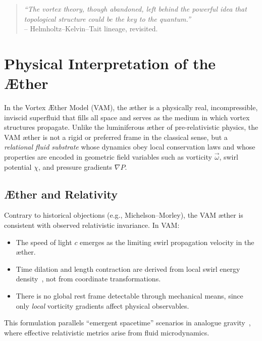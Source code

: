     \begin{quote}

    \textit{“The vortex theory, though abandoned, left behind the powerful idea that topological structure could be the key to the quantum.”} \\[0.5em]

    \hfill -- Helmholtz–Kelvin–Tait lineage, revisited.

    \end{quote}


\section{Physical Interpretation of the Æther}\label{sec:aether-interpretation}

    In the Vortex \AE ther Model (VAM), the \ae ther is a physically real, incompressible, inviscid superfluid that fills all space and serves as the medium in which vortex structures propagate. Unlike the luminiferous æther of pre-relativistic physics, the VAM æther is not a rigid or preferred frame in the classical sense, but a \emph{relational fluid substrate} whose dynamics obey local conservation laws and whose properties are encoded in geometric field variables such as vorticity $\vec{\omega}$, swirl potential $\chi$, and pressure gradients $\nabla P$.

    \subsection{Æther and Relativity}

        Contrary to historical objections (e.g., Michelson--Morley), the VAM æther is consistent with observed relativistic invariance. In VAM:

        \begin{itemize}
            \item The speed of light $c$ emerges as the limiting swirl propagation velocity in the æther.
            \item Time dilation and length contraction are derived from local swirl energy density~\cite{VAM-1}, not from coordinate transformations.
            \item There is no global rest frame detectable through mechanical means, since only \emph{local} vorticity gradients affect physical observables.
        \end{itemize}

        This formulation parallels “emergent spacetime” scenarios in analogue gravity~\cite{barcelo2011}, where effective relativistic metrics arise from fluid microdynamics.

